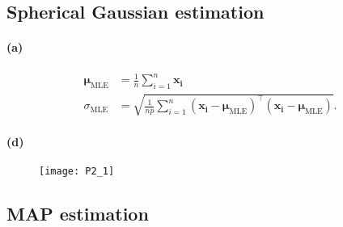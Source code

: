 \documentclass[a4paper,11pt]{article}
\begin{document}
\subsection{Spherical Gaussian estimation}
\paragraph{(a)}
\begin{align*}
\boldsymbol\mu_\textrm{MLE}&=\frac{1}{n}\sum_{i=1}^n\mathbf{x_i}\\
\sigma_\textrm{MLE}&=\sqrt{\frac{1}{np}\sum_{i=1}^n(\mathbf{x_i}-\boldsymbol\mu_\textrm{MLE})^\top(\mathbf{x_i}-\boldsymbol\mu_\textrm{MLE})}.
\end{align*}
\paragraph{(d)}
\begin{figure}
  \begin{center}
    \texttt{[image: P2\_1]}
  \end{center}
\end{figure}
\subsection{MAP estimation}
\end{document}
